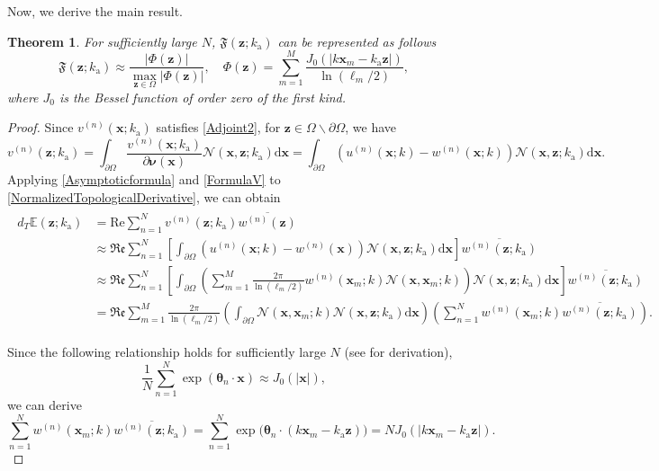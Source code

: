 \documentclass[a4,10pt]{article}
\newcommand{\ka}{k_{\mathrm{a}}}
\newcommand{\p}{\partial}
\newcommand{\rd}{\mathrm{d}}
\newcommand{\mx}{\mathbf{x}}
\newcommand{\mz}{\mathbf{z}}
\newcommand{\vn}{\boldsymbol{\nu}}
\newcommand{\vt}{\boldsymbol{\theta}}
\theoremstyle{plain}
\newtheorem{theorem}{Theorem}[section]
\theoremstyle{remark}
\begin{document}
Now, we derive the main result.
\begin{theorem}\label{Theorem}
For sufficiently large $N$, $\mathfrak{F}(\mz;\ka)$ can be represented as follows
\begin{equation}\label{Structure_Function}
\mathfrak{F}(\mz;\ka)\approx\frac{|\Phi(\mz)|}{\displaystyle\max_{\mz\in\Omega}|\Phi(\mz)|},\quad\Phi(\mz)=\sum_{m=1}^{M}\frac{J_0(|k\mx_m-\ka\mz|)}{\ln(\ell_m/2)},
\end{equation}
where $J_0$ is the Bessel function of order zero of the first kind.
\end{theorem}
\begin{proof}
Since $v^{(n)}(\mx;\ka)$ satisfies \eqref{Adjoint2}, for $\mz\in\Omega\backslash\p\Omega$, we have
\begin{equation}\label{FormulaV}
v^{(n)}(\mz;\ka)=\int_{\p\Omega}\frac{v^{(n)}(\mx;\ka)}{\p\vn(\mx)}\mathcal{N}(\mx,\mz;\ka)\rd\mx=\int_{\p\Omega}\left(u^{(n)}(\mx;k)-w^{(n)}(\mx;k)\right)\mathcal{N}(\mx,\mz;\ka)\rd\mx.
\end{equation}
Applying \eqref{Asymptoticformula} and \eqref{FormulaV} to \eqref{NormalizedTopologicalDerivative}, we can obtain
\begin{align}
\begin{aligned}\label{Term}
d_T\mathbb{E}(\mz;\ka)&=\mathrm{Re}\sum_{n=1}^{N}v^{(n)}(\mz;\ka)\overline{w^{(n)}(\mz)}\\
&\approx\mathfrak{Re}\sum_{n=1}^{N}\left[\int_{\p\Omega}\left(u^{(n)}(\mx;k)-w^{(n)}(\mx)\right)\mathcal{N}(\mx,\mz;\ka)\rd\mx\right]\overline{w^{(n)}(\mz;\ka)}\\
&\approx\mathfrak{Re}\sum_{n=1}^{N}\left[\int_{\p\Omega}\left(\sum_{m=1}^{M}\frac{2\pi}{\ln(\ell_m/2)}w^{(n)}(\mx_m;k)\mathcal{N}(\mx,\mx_m;k)\right)\mathcal{N}(\mx,\mz;\ka)\rd\mx\right]\overline{w^{(n)}(\mz;\ka)}\\
&=\mathfrak{Re}\sum_{m=1}^{M}\frac{2\pi}{\ln(\ell_m/2)}\left(\int_{\p\Omega}\mathcal{N}(\mx,\mx_m;k)\mathcal{N}(\mx,\mz;\ka)\rd\mx\right)\left(\sum_{n=1}^{N}w^{(n)}(\mx_m;k)\overline{w^{(n)}(\mz;\ka)}\right).
\end{aligned}
\end{align}

Since the following relationship holds for sufficiently large $N$ (see \cite{P-SUB3} for derivation),
\[\frac{1}{N}\sum_{n=1}^{N}\exp(\vt_n\cdot\mx)\approx J_0(|\mx|),\]
we can derive
\begin{equation}\label{Term1}
\sum_{n=1}^{N}w^{(n)}(\mx_m;k)\overline{w^{(n)}(\mz;\ka)}=\sum_{n=1}^{N}\exp\Big(\vt_n\cdot(k\mx_m-\ka\mz)\Big)=NJ_0(|k\mx_m-\ka\mz|).
\end{equation}


\end{proof}
\end{document}
